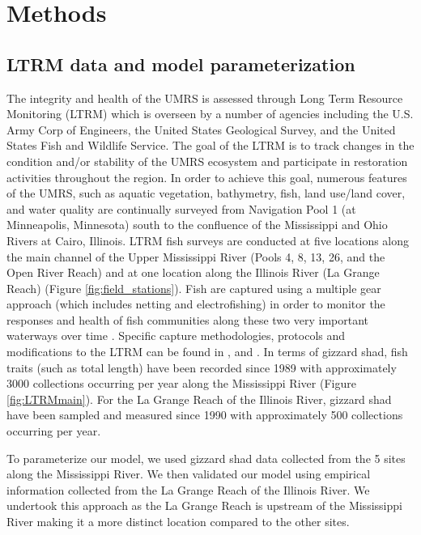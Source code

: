 \documentclass[preprint,review,12pt,authoryear]{elsarticle}
\begin{document}
\section{Methods}
\subsection{LTRM data and model parameterization} \label{LTRM}
The integrity and health of the UMRS is assessed through Long Term Resource Monitoring (LTRM) which is overseen by a number of agencies including the U.S. Army Corp of Engineers, the United States Geological Survey, and the United States Fish and Wildlife Service. 
The goal of the LTRM is to track changes in the condition and/or stability of the UMRS ecosystem and participate in restoration activities throughout the region. 
In order to achieve this goal, numerous features of the UMRS, such as aquatic vegetation, bathymetry, fish, land use/land cover, and water quality are continually surveyed from Navigation Pool 1 (at Minneapolis, Minnesota) south to the confluence of the Mississippi and Ohio Rivers at Cairo, Illinois. 
LTRM fish surveys are conducted at five locations along the main channel of the Upper Mississippi River (Pools 4, 8, 13, 26, and the Open River Reach) and at one location along the Illinois River (La Grange Reach) (Figure \ref{fig:field_stations}). 
Fish are captured using a multiple gear approach (which includes netting and electrofishing) in order to monitor the responses and health of fish communities along these two very important waterways over time \citep{gutreuter1995long}. 
Specific capture methodologies, protocols and modifications to the LTRM can be found in \cite{gutreuter1995long}, and \cite{ickes2002evaluation}. 
In terms of gizzard shad, fish traits (such as total length) have been recorded since 1989 with approximately 3000 collections occurring per year along the Mississippi River (Figure \ref{fig:LTRMmain}). 
For the La Grange Reach of the Illinois River, gizzard shad have been sampled and measured since 1990 with approximately 500 collections occurring per year.

To parameterize our model, we used gizzard shad data collected from the 5 sites along the Mississippi River.  
We then validated our model using empirical information collected from the La Grange Reach of the Illinois River. 
We undertook this approach as the La Grange Reach is upstream of the Mississippi River making it a more distinct location compared to the other sites. 
\end{document}
